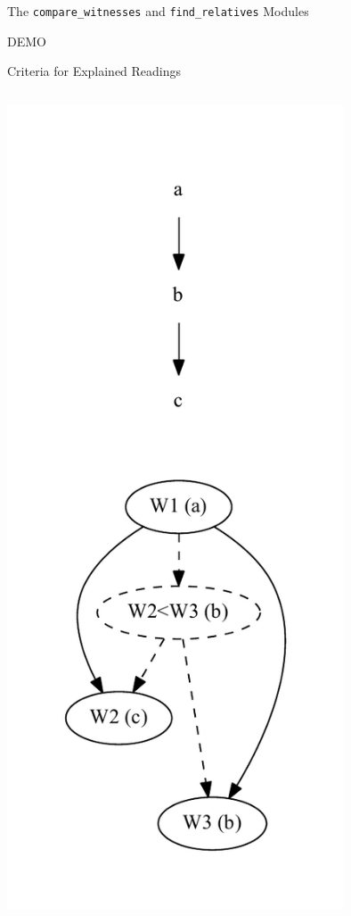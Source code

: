 \documentclass[10pt]{beamer}
\begin{document}
	\begin{frame}{The \texttt{compare\_witnesses} and \texttt{find\_relatives} Modules}
		\begin{center}
			DEMO
		\end{center}
	\end{frame}
	\begin{frame}{Criteria for Explained Readings}
		\begin{columns}
			\begin{column}{0.4\textwidth}
				\centering
				\includegraphics[width=0.75\textwidth]{../graphics/intermediary-node-example.pdf}

\end{column}
\end{columns}
\end{frame}
\end{document}
